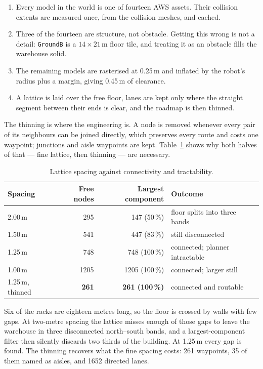 \documentclass[11pt,a4paper]{article}
\theoremstyle{definition}
\newcommand{\code}[1]{\texttt{\small #1}}
\begin{document}
\begin{enumerate}[nosep]
  \item Every model in the world is one of fourteen AWS assets. Their collision
        extents are measured once, from the collision meshes, and cached.
  \item Three of the fourteen are structure, not obstacle. Getting this
        wrong is not a detail: \code{GroundB} is a $14 \times 21$\,m floor tile,
        and treating it as an obstacle fills the warehouse solid.
  \item The remaining models are rasterised at 0.25\,m and inflated by the
        robot's radius plus a margin, giving 0.45\,m of clearance.
  \item A lattice is laid over the free floor, lanes are kept only where the
        straight segment between their ends is clear, and the roadmap is then
        thinned.
\end{enumerate}

The thinning is where the engineering is. A node is removed whenever every pair
of its neighbours can be joined directly, which preserves every route and costs
one waypoint; junctions and aisle waypoints are kept. Table~\ref{tab:lattice}
shows why both halves of that --- fine lattice, then thinning --- are
necessary.

\begin{table}[H]
\centering\small
\caption{Lattice spacing against connectivity and tractability.}
\label{tab:lattice}
\begin{tabular}{@{}lrrl@{}}
\toprule
\textbf{Spacing} & \textbf{Free nodes} & \textbf{Largest component} & \textbf{Outcome} \\
\midrule
2.00\,m  & 295  & 147 (50\,\%)  & floor splits into three bands \\
1.50\,m  & 541  & 447 (83\,\%)  & still disconnected \\
1.25\,m  & 748  & 748 (100\,\%) & connected; planner intractable \\
1.00\,m  & 1205 & 1205 (100\,\%)& connected; larger still \\
\midrule
1.25\,m, thinned & \textbf{261} & \textbf{261 (100\,\%)} & connected and routable \\
\bottomrule
\end{tabular}
\end{table}

Six of the racks are eighteen metres long, so the floor is crossed by walls
with few gaps. At two-metre spacing the lattice misses enough of those gaps to
leave the warehouse in three disconnected north--south bands, and a
largest-component filter then silently discards two thirds of the building. At
1.25\,m every gap is found. The thinning recovers what the fine spacing costs:
261 waypoints, 35 of them named as aisles, and 1652 directed lanes.
\end{document}
